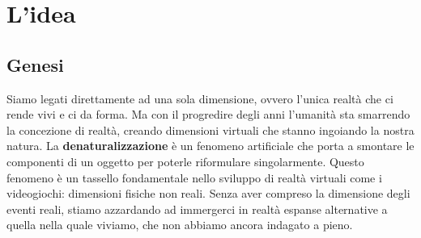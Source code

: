 \newcommand{\mylanguages}{italian} %
\newcommand{\mytitle}{Black Cube}
\newcommand{\mysubtitle}{Denaturalizzazione estremizzata, ambiente virtuale espanso}
\newcommand{\authorone}{Giancarlo Bottalico}
\newcommand{\institutione}{Conservatorio di musica "N. Piccinni", Bari}
\newcommand{\emailone}{giancarlobottalico@gmail.com}


	\maketitle
	\thispagestyle{empty}
	
\section*{L'idea}
	
	\subsection*{Genesi}
	Siamo legati direttamente ad una sola dimensione, ovvero l'unica realtà che ci rende vivi e ci da forma. Ma con il progredire degli anni l'umanità sta smarrendo la concezione di realtà, creando dimensioni virtuali che stanno ingoiando la nostra natura.
	La \textbf{denaturalizzazione} è un fenomeno artificiale che porta a smontare le componenti di un oggetto per poterle riformulare singolarmente. Questo fenomeno è un tassello fondamentale nello sviluppo di realtà virtuali come i videogiochi: dimensioni fisiche non reali.
	Senza aver compreso la dimensione degli eventi reali, stiamo azzardando ad immergerci in realtà espanse alternative a quella nella quale viviamo, che non abbiamo ancora indagato a pieno.
	
